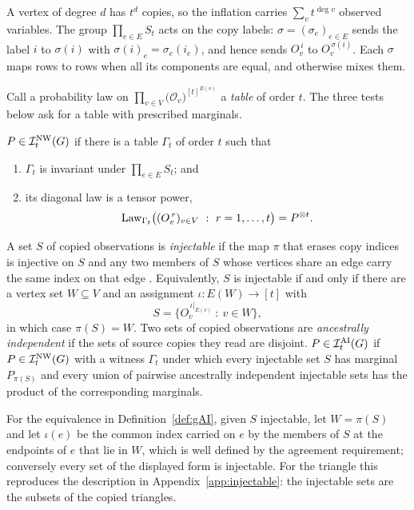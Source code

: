 A vertex of degree $d$ has $t^d$ copies, so the inflation carries $\sum_v t^{\deg v}$ observed variables. The group $\prod_{e\in E}S_t$ acts on the copy labels: $\sigma=(\sigma_e)_{e\in E}$ sends the label $i$ to $\sigma(i)$ with $\sigma(i)_e=\sigma_e(i_e)$, and hence sends $O_v^{\,i}$ to $O_v^{\,\sigma(i)}$. Each $\sigma$ maps rows to rows when all its components are equal, and otherwise mixes them.

Call a probability law on $\prod_{v\in V}\bigl(\mathcal O_v\bigr)^{[t]^{E(v)}}$ a \emph{table} of order $t$. The three tests below ask for a table with prescribed marginals.

\begin{definition}\label{def:gNW}\label{def:NW}
$P\in\mathcal I^{\mathrm{NW}}_t(G)$ if there is a table $\Gamma_t$ of order $t$ such that
\begin{enumerate}[label=(\roman*),nosep]
\item $\Gamma_t$ is invariant under $\prod_{e\in E}S_t$; and
\item its diagonal law is a tensor power,
\[
\Law_{\Gamma_t}\bigl((O_v^{\,r})_{v\in V}\ :\ r=1,\dots,t\bigr)=P^{\otimes t}.
\]
\end{enumerate}
\end{definition}

\begin{definition}\label{def:gAI}\label{def:AI}
A set $S$ of copied observations is \emph{injectable} if the map $\pi$ that erases copy indices is injective on $S$ and any two members of $S$ whose vertices share an edge carry the same index on that edge \cite[Definition~4]{WSF2019}. Equivalently, $S$ is injectable if and only if there are a vertex set $W\subseteq V$ and an assignment $\iota:E(W)\to[t]$ with
\[
S=\bigl\{O_v^{\,\iota|_{E(v)}}\ :\ v\in W\bigr\},
\]
in which case $\pi(S)=W$. Two sets of copied observations are \emph{ancestrally independent} if the sets of source copies they read are disjoint. $P\in\mathcal I^{\mathrm{AI}}_t(G)$ if $P\in\mathcal I^{\mathrm{NW}}_t(G)$ with a witness $\Gamma_t$ under which every injectable set $S$ has marginal $P_{\pi(S)}$ and every union of pairwise ancestrally independent injectable sets has the product of the corresponding marginals.
\end{definition}

For the equivalence in Definition~\ref{def:gAI}, given $S$ injectable, let $W=\pi(S)$ and let $\iota(e)$ be the common index carried on $e$ by the members of $S$ at the endpoints of $e$ that lie in $W$, which is well defined by the agreement requirement; conversely every set of the displayed form is injectable. For the triangle this reproduces the description in Appendix~\ref{app:injectable}: the injectable sets are the subsets of the copied triangles.

